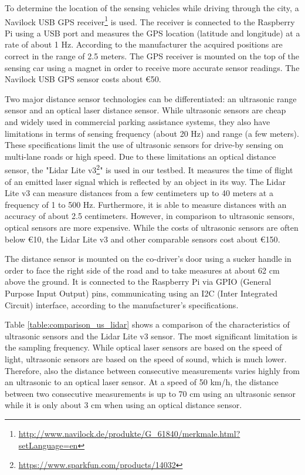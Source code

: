 To determine the location of the sensing vehicles while driving through the city, a Navilock USB GPS receiver\footnote{\url{http://www.navilock.de/produkte/G_61840/merkmale.html?setLanguage=en}} is used. The receiver is connected to the Raspberry Pi using a USB port and measures the GPS location (latitude and longitude) at a rate of about 1 Hz. According to the manufacturer the acquired positions are correct in the range of 2.5 meters. The GPS receiver is mounted on the top of the sensing car using a magnet in order to receive more accurate sensor readings. The Navilock USB GPS sensor costs about \euro{50}.

Two major distance sensor technologies can be differentiated: an ultrasonic range sensor and an optical laser distance sensor. While ultrasonic sensors are cheap and widely used in commercial parking assistance systems, they also have limitations in terms of sensing frequency (about 20 Hz) and range (a few meters). These specifications limit the use of ultrasonic sensors for drive-by sensing on multi-lane roads or high speed. Due to these limitations an optical distance sensor, the "Lidar Lite v3\footnote{\url{https://www.sparkfun.com/products/14032}}" is used in our testbed. It measures the time of flight of an emitted laser signal which is reflected by an object in its way. The Lidar Lite v3 can measure distances from a few centimeters up to 40 meters at a frequency of 1 to 500 Hz. Furthermore, it is able to measure distances with an accuracy of about 2.5 centimeters. However, in comparison to ultrasonic sensors, optical sensors are more expensive. While the costs of ultrasonic sensors are often below \euro{10}, the Lidar Lite v3 and other comparable sensors cost about \euro{150}.

The distance sensor is mounted on the co-driver's door using a sucker handle in order to face the right side of the road and to take measures at about 62 cm above the ground. It is connected to the Raspberry Pi via GPIO (General Purpose Input Output) pins, communicating using an I2C (Inter Integrated Circuit) interface, according to the manufacturer's specifications.

Table \ref{table:comparison_us_lidar} shows a comparison of the characteristics of ultrasonic sensors and the Lidar Lite v3 sensor. The most significant limitation is the sampling frequency. While optical laser sensors are based on the speed of light, ultrasonic sensors are based on the speed of sound, which is much lower. Therefore, also the distance between consecutive measurements varies highly from an ultrasonic to an optical laser sensor. At a speed of 50 km/h, the distance between two consecutive measurements is up to 70 cm using an ultrasonic sensor while it is only about 3 cm when using an optical distance sensor.



